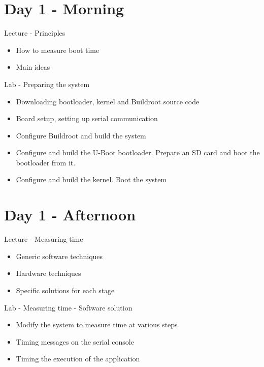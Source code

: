\documentclass[a4paper,12pt,obeyspaces,spaces,hyphens]{article}
\begin{document}
\section{Day 1 - Morning}

\feagendatwocolumn
{Lecture - Principles}
{
  \begin{itemize}
  \item How to measure boot time
  \item Main ideas
  \end{itemize}
}
{Lab - Preparing the system}
{
 \begin{itemize}
 \item Downloading bootloader, kernel and Buildroot source code
 \item Board setup, setting up serial communication
 \item Configure Buildroot and build the system
 \item Configure and build the U-Boot bootloader. Prepare an SD card
       and boot the bootloader from it.
 \item Configure and build the kernel. Boot the system
 \end{itemize}
}

\section{Day 1 - Afternoon}

\feagendatwocolumn
{Lecture - Measuring time}
{
  \begin{itemize}
  \item Generic software techniques
  \item Hardware techniques
  \item Specific solutions for each stage
  \end{itemize}
}
{Lab - Measuring time - Software solution}
{
 \begin{itemize}
 \item Modify the system to measure time at various steps
 \item Timing messages on the serial console
 \item Timing the execution of the application
 \end{itemize}
}
\end{document}
